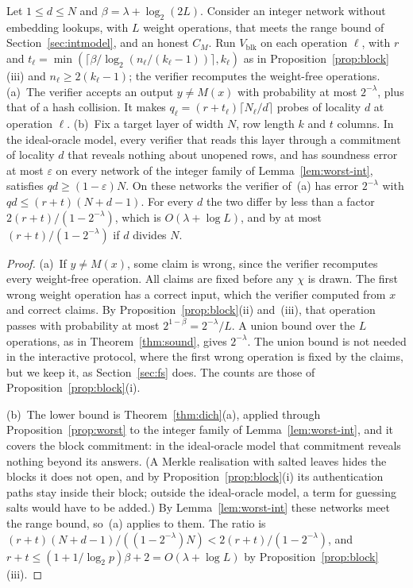 \begin{corollary}
\label{cor:block}
Let $1\le d\le N$ and $\beta=\lambda+\log_2(2L)$. Consider an integer network without embedding
lookups, with $L$ weight operations, that meets the range bound of Section~\ref{sec:intmodel}, and an
honest $C_M$. Run $V_{\mathrm{blk}}$ on each operation $\ell$, with $r$ and
$t_\ell=\min(\lceil\beta/\log_2(n_\ell/(k_\ell-1))\rceil,k_\ell)$ as in
Proposition~\ref{prop:block}(iii) and $n_\ell\ge2(k_\ell-1)$; the verifier recomputes the weight-free
operations.
(a)~The verifier accepts an output $y\neq M(x)$ with probability at most $2^{-\lambda}$, plus that of
a hash collision. It makes $q_\ell=(r+t_\ell)\lceil N_\ell/d\rceil$ probes of locality $d$ at
operation $\ell$.
(b)~Fix a target layer of width $N$, row length $k$ and $t$ columns. In the ideal-oracle model,
every verifier that reads this layer through a commitment of locality $d$ that reveals nothing about
unopened rows, and has soundness error at most $\varepsilon$ on every network of the integer family
of Lemma~\ref{lem:worst-int}, satisfies $qd\ge(1-\varepsilon)N$. On these networks the verifier
of~(a) has error $2^{-\lambda}$ with $qd\le(r+t)(N+d-1)$. For every $d$ the two differ by less than a
factor $2(r+t)/(1-2^{-\lambda})$, which is $O(\lambda+\log L)$, and by at most
$(r+t)/(1-2^{-\lambda})$ if $d$ divides $N$.
\end{corollary}

\begin{proof}
(a)~If $y\neq M(x)$, some claim is wrong, since the verifier recomputes every weight-free
operation. All claims are fixed before any $\chi$ is drawn. The first wrong weight operation has a
correct input, which the verifier computed from $x$ and correct claims. By
Proposition~\ref{prop:block}(ii) and~(iii), that operation passes with probability at most
$2^{1-\beta}=2^{-\lambda}/L$. A union bound over the $L$ operations, as in Theorem~\ref{thm:sound},
gives $2^{-\lambda}$. The union bound is not needed in the interactive protocol, where the first
wrong operation is fixed by the claims, but we keep it, as Section~\ref{sec:fs} does. The counts are
those of Proposition~\ref{prop:block}(i).

(b)~The lower bound is Theorem~\ref{thm:dich}(a), applied through Proposition~\ref{prop:worst} to the
integer family of Lemma~\ref{lem:worst-int}, and it covers the block commitment: in the ideal-oracle
model that commitment reveals nothing beyond its answers. (A Merkle realisation with salted leaves
hides the blocks it does not open, and by Proposition~\ref{prop:block}(i) its authentication paths
stay inside their block; outside the ideal-oracle model, a term for guessing salts would have to be
added.) By Lemma~\ref{lem:worst-int} these networks meet the range bound, so~(a) applies to them. The
ratio is $(r+t)(N+d-1)/((1-2^{-\lambda})N)<2(r+t)/(1-2^{-\lambda})$, and
$r+t\le(1+1/\log_2p)\beta+2=O(\lambda+\log L)$ by Proposition~\ref{prop:block}(iii).
\end{proof}

